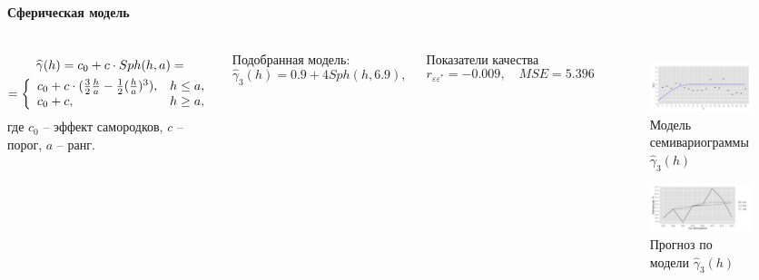 \documentclass[notheorems]{beamer}
\theoremstyle{definition}
\theoremstyle{example}
\theoremstyle{plain}
\begin{document}
\begin{frame}
  \frametitle{\large\subsecname}
  \framesubtitle{Сферическая модель}
  \begin{columns}[c]
  {\footnotesize
  \begin{equation}\begin{gathered}
  \label{eq:sph}
    \widehat{\gamma}(h) = c_0 + c \cdot Sph(h, a) = \\
    = \left\{
    \begin{array}{l l}
      c_0 + c \cdot (\frac{3}{2} \frac{h}{a} - \frac{1}{2}(\frac{h}{a})^3), & h \le a, \\
      c_0 + c, & h \geq a,
    \end{array} \right.
  \end{gathered}\end{equation}
  где $ c_0 $ -- эффект самородков, $ c $ -- порог, $ a $ -- ранг.

  \vspace{0.5em}

  Подобранная модель:
  \begin{equation}
  \label{eq:gamma5}
    \widehat{\gamma}_3(h) = 0.9 + 4 Sph(h, 6.9),
  \end{equation}

  Показатели качества
  \begin{equation*}
    r_{\varepsilon\varepsilon^{*}} = -0.009, \quad MSE = 5.396
  \end{equation*}
  }

  \vspace{-14.5pt}
  \begin{figure}[H]
    \includegraphics[width=0.9\linewidth]{../../figures/variogram/sph-fit-adapt-modeled.png} \\
    \caption{Модель семивариограммы $\widehat{\gamma}_3(h)$}
    \includegraphics[width=0.9\linewidth]{../../figures/variogram/sph-fit-adapt-cross-prediction.png}
    \caption{Прогноз по модели $\widehat{\gamma}_3(h)$}
  \end{figure}
  \end{columns}
\end{frame}
\end{document}
